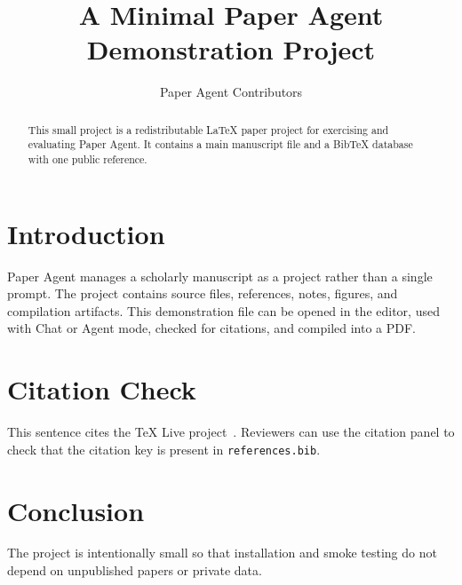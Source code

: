 \documentclass{article}
\title{A Minimal Paper Agent Demonstration Project}
\author{Paper Agent Contributors}
\date{}
\begin{document}
\maketitle

\begin{abstract}
This small project is a redistributable LaTeX paper project for exercising
and evaluating Paper Agent. It contains a
main manuscript file and a BibTeX database with one public reference.
\end{abstract}

\section{Introduction}

Paper Agent manages a scholarly manuscript as a project rather than a single
prompt. The project contains source files, references, notes, figures, and
compilation artifacts. This demonstration file can be opened in the editor,
used with Chat or Agent mode, checked for citations, and compiled into a PDF.

\section{Citation Check}

This sentence cites the TeX Live project~\cite{texlive}. Reviewers can use the
citation panel to check that the citation key is present in \texttt{references.bib}.

\section{Conclusion}

The project is intentionally small so that installation and smoke testing do not
depend on unpublished papers or private data.



\end{document}
